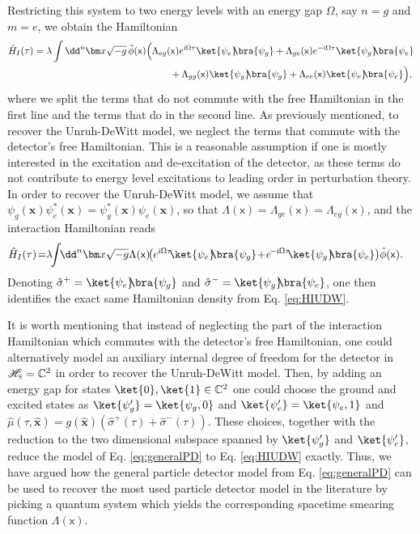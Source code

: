 \documentclass[letterpaper,12pt,titlepage,oneside,final]{book}
\newcommand{\mf}{\mathsf}%
\newcommand{\ii}{\mathrm{i}}
\begin{document}
Restricting this system to two energy levels with an energy gap $\Omega$, say $n = g$ and $m = e$, we obtain the Hamiltonian
\begin{align}
    \hat{H}_I(\tau) = \lambda \int  \dd^n \bm x \sqrt{-g}\,\hat{\phi}(\mf x)
    &\Big(\Lambda_{eg}(\mf x)e^{\ii\Omega\tau}\ket{\psi_e}\!\!\bra{\psi_g} +\Lambda_{ge}(\mf x)e^{-\ii\Omega\tau} \ket{\psi_g}\!\!\bra{\psi_e}\nonumber\\
    &\:\:\:\:\:\:\:\:\:\:\:+\Lambda_{gg}(\mf x)\ket{\psi_g}\!\!\bra{\psi_g}+\Lambda_{ee}(\mf x)\ket{\psi_e}\!\!\bra{\psi_e}\Big),\nonumber
\end{align}
where we split the terms that do not commute with the free Hamiltonian in the first line and the terms that do in the second line. As previously mentioned, to recover the Unruh-DeWitt model, we neglect the terms that commute with the detector's free Hamiltonian. This is a reasonable assumption if one is mostly interested in the excitation and de-excitation of the detector, as these terms do not contribute to energy level excitations to leading order in perturbation theory. In order to recover the Unruh-DeWitt model, we assume that \mbox{$\psi_g(\bm x)\psi^*_e(\bm x) = \psi^*_g(\bm x)\psi_e(\bm x)$}, so that \mbox{$\Lambda(\mf x) = \Lambda_{ge}(\mf x) = \Lambda_{eg}(\mf x)$}, and the interaction Hamiltonian reads
\begin{align}
    \hat{H}_I(\tau) \!=& \lambda\!\! \int\!\! \dd^n \bm x \sqrt{-g} \Lambda(\mf x)\!\!\left(e^{\ii\Omega\tau}\!\!\:\!\ket{\psi_e}\!\!\bra{\psi_g} \!+\!e^{\!-\ii\Omega\tau} \!\:\!\!\ket{\psi_g}\!\!\bra{\psi_e}\right)\!\hat{\phi}(\mf x).
\end{align}
Denoting $\hat{\sigma}^+ = \ket{\psi_e}\!\!\bra{\psi_g}$ and $\hat{\sigma}^- = \ket{\psi_g}\!\!\bra{\psi_e}$, one then identifies the exact same Hamiltonian density from Eq. \eqref{eq:HIUDW}.

It is worth mentioning that instead of neglecting the part of the interaction Hamiltonian which commutes with the detector's free Hamiltonian, one could alternatively model an auxiliary internal degree of freedom for the detector in $\mathscr{H}_\textsc{s} = \mathbb{C}^2$ in order to recover the Unruh-DeWitt model. Then, by adding an energy gap for states $\ket{0},\ket{1}\in\mathbb{C}^2$ one could choose the ground and excited states as $\ket{\psi_g'} = \ket{\psi_g,0}$ and $\ket{\psi_e'} = \ket{\psi_e,1}$ and \mbox{$\hat{\mu}(\tau,\hat{\bm x}) = g(\hat{\bm x})(\hat{\sigma}^+(\tau) + \hat{\sigma}^-(\tau))$}. These choices, together with the reduction to the two dimensional subspace spanned by $\ket{\psi_g'}$ and $\ket{\psi_e'}$, reduce the model of Eq. \eqref{eq:generalPD} to Eq. \eqref{eq:HIUDW} exactly. Thus, we have argued how the general particle detector model from Eq. \eqref{eq:generalPD} can be used to recover the most used particle detector model in the literature by picking a quantum system which yields the corresponding spacetime smearing function $\Lambda(\mf x)$.
\end{document}
